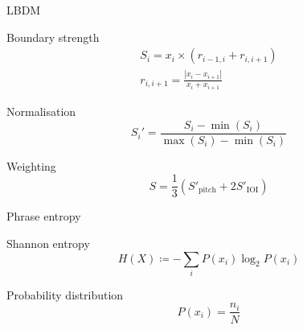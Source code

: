 \documentclass{beamer}
\begin{document}
\begin{frame}{LBDM}
    \begin{block}{Boundary strength}
        \begin{gather*}
            S_i=x_i\times (r_{i-1, i} + r_{i, i+1}) \\
            r_{i, i+1}=\frac{|x_{i}-x_{i+1}|}{x_{i}+x_{i+1}}
        \end{gather*}
    \end{block}
    \begin{block}{Normalisation}
        \begin{equation*}
            S_i'=\frac{S_i-\min(S_i)}{\max(S_i)-\min(S_i)}
        \end{equation*}
    \end{block}
    \begin{block}{Weighting}
        \begin{equation*}
            S=\frac{1}{3}\left( S'_\mathrm{pitch} + 2 S'_\mathrm{IOI} \right)
        \end{equation*}
    \end{block}
    \hfill\cite{cambouropoulos_lbdm_2011}

\end{frame}

\begin{frame}{Phrase entropy}
    \begin{block}{Shannon entropy}
        \begin{equation*}
            H(X)\coloneq-\sum_i P(x_i)\log_2 P(x_i)
        \end{equation*}
    \end{block}
    \begin{block}{Probability distribution}
        \begin{equation*}
            P(x_i)=\frac{n_i}{N}
        \end{equation*}
    \end{block}
    \hfill\cite{li_automatic_2019}

\end{frame}
\end{document}
